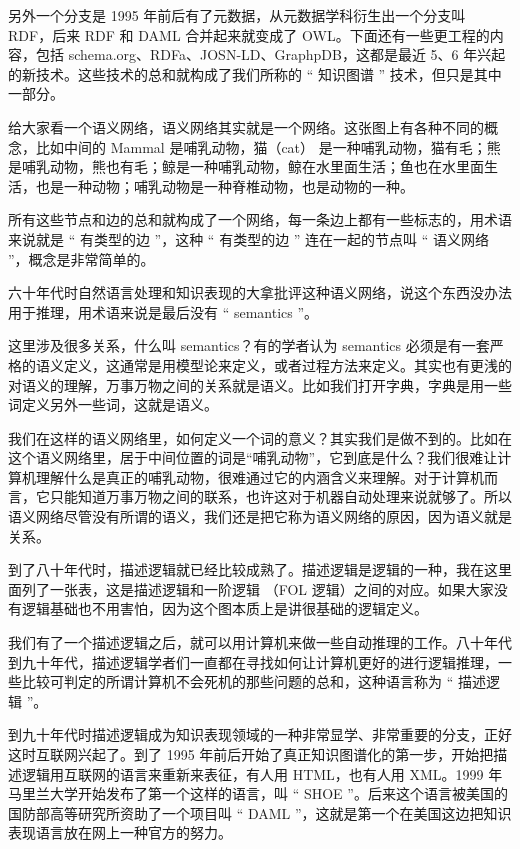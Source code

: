 另外一个分支是 1995 年前后有了元数据，从元数据学科衍生出一个分支叫 RDF，后来 RDF 和 DAML 合并起来就变成了 OWL。下面还有一些更工程的内容，包括 schema.org、RDFa、JOSN-LD、GraphpDB，这都是最近 5、6 年兴起的新技术。这些技术的总和就构成了我们所称的 “ 知识图谱 ” 技术，但只是其中一部分。

给大家看一个语义网络，语义网络其实就是一个网络。这张图上有各种不同的概念，比如中间的 Mammal 是哺乳动物，猫（cat） 是一种哺乳动物，猫有毛；熊是哺乳动物，熊也有毛；鲸是一种哺乳动物，鲸在水里面生活；鱼也在水里面生活，也是一种动物；哺乳动物是一种脊椎动物，也是动物的一种。

所有这些节点和边的总和就构成了一个网络，每一条边上都有一些标志的，用术语来说就是 “ 有类型的边 ”，这种 “ 有类型的边 ” 连在一起的节点叫 “ 语义网络 ”，概念是非常简单的。

六十年代时自然语言处理和知识表现的大拿批评这种语义网络，说这个东西没办法用于推理，用术语来说是最后没有 “ semantics ”。

这里涉及很多关系，什么叫 semantics？有的学者认为 semantics 必须是有一套严格的语义定义，这通常是用模型论来定义，或者过程方法来定义。其实也有更浅的对语义的理解，万事万物之间的关系就是语义。比如我们打开字典，字典是用一些词定义另外一些词，这就是语义。

我们在这样的语义网络里，如何定义一个词的意义？其实我们是做不到的。比如在这个语义网络里，居于中间位置的词是“哺乳动物”，它到底是什么？我们很难让计算机理解什么是真正的哺乳动物，很难通过它的内涵含义来理解。对于计算机而言，它只能知道万事万物之间的联系，也许这对于机器自动处理来说就够了。所以语义网络尽管没有所谓的语义，我们还是把它称为语义网络的原因，因为语义就是关系。


到了八十年代时，描述逻辑就已经比较成熟了。描述逻辑是逻辑的一种，我在这里面列了一张表，这是描述逻辑和一阶逻辑 （FOL 逻辑）之间的对应。如果大家没有逻辑基础也不用害怕，因为这个图本质上是讲很基础的逻辑定义。

我们有了一个描述逻辑之后，就可以用计算机来做一些自动推理的工作。八十年代到九十年代，描述逻辑学者们一直都在寻找如何让计算机更好的进行逻辑推理，一些比较可判定的所谓计算机不会死机的那些问题的总和，这种语言称为 “ 描述逻辑 ”。


到九十年代时描述逻辑成为知识表现领域的一种非常显学、非常重要的分支，正好这时互联网兴起了。到了 1995 年前后开始了真正知识图谱化的第一步，开始把描述逻辑用互联网的语言来重新来表征，有人用 HTML，也有人用 XML。1999 年马里兰大学开始发布了第一个这样的语言，叫 “ SHOE ”。后来这个语言被美国的国防部高等研究所资助了一个项目叫 “ DAML ”，这就是第一个在美国这边把知识表现语言放在网上一种官方的努力。

